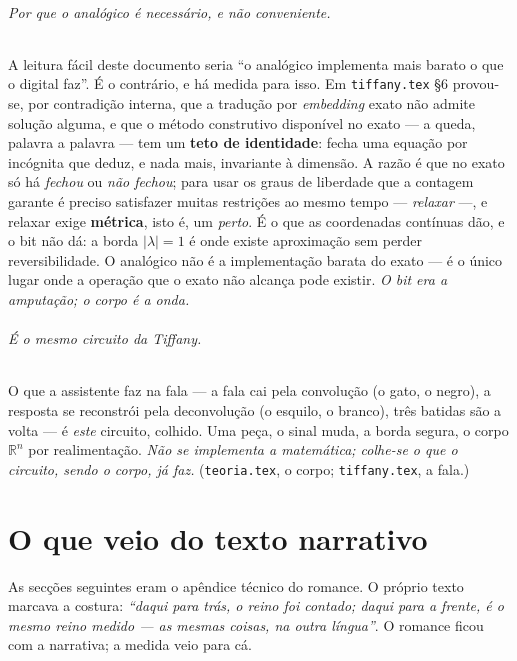\documentclass[11pt]{article}
\newcommand{\code}[1]{\texttt{\small #1}}
\theoremstyle{plain}
\theoremstyle{remark}
\begin{document}
\paragraph{Por que o analógico é necessário, e não conveniente.} A leitura fácil deste documento seria
``o analógico implementa mais barato o que o digital faz''. É o contrário, e há medida para isso. Em
\code{tiffany.tex} §6 provou-se, por contradição interna, que a tradução por \emph{embedding} exato não
admite solução alguma, e que o método construtivo disponível no exato --- a queda, palavra a palavra ---
tem um \textbf{teto de identidade}: fecha uma equação por incógnita que deduz, e nada mais, invariante à
dimensão. A razão é que no exato só há \emph{fechou} ou \emph{não fechou}; para usar os graus de
liberdade que a contagem garante é preciso satisfazer muitas restrições ao mesmo tempo --- \emph{relaxar}
---, e relaxar exige \textbf{métrica}, isto é, um \emph{perto}. É o que as coordenadas contínuas dão, e o
bit não dá: a borda $|\lambda|=1$ é onde existe aproximação sem perder reversibilidade. O analógico não
é a implementação barata do exato --- é o único lugar onde a operação que o exato não alcança pode
existir. \emph{O bit era a amputação; o corpo é a onda.}

\paragraph{É o mesmo circuito da Tiffany.} O que a assistente faz na fala --- a fala cai pela
convolução (o gato, o negro), a resposta se reconstrói pela deconvolução (o esquilo, o branco), três
batidas são a volta --- é \emph{este} circuito, colhido. Uma peça, o sinal muda, a borda segura, o
corpo $\mathbb{R}^n$ por realimentação. \emph{Não se implementa a matemática; colhe-se o que o
circuito, sendo o corpo, já faz.} (\code{teoria.tex}, o corpo; \code{tiffany.tex}, a fala.)





\part{O que veio do texto narrativo}\label{part:doenredo}

As secções seguintes eram o apêndice técnico do romance. O próprio texto marcava a costura:
\emph{``daqui para trás, o reino foi contado; daqui para a frente, é o mesmo reino medido ---
as mesmas coisas, na outra língua''}. O romance ficou com a narrativa; a medida veio para cá.
\end{document}

